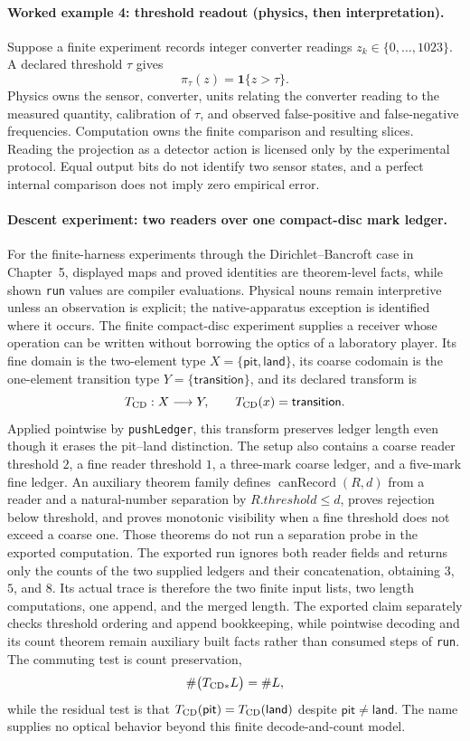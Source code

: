 \paragraph{Worked example 4: threshold readout (physics, then interpretation).}
Suppose a finite experiment records integer converter readings \(z_k\in\{0,\ldots,1023\}\).  A declared threshold
\(\tau\) gives
\[
              \pi_\tau(z)=\mathbf 1\{z>\tau\}.
\]
Physics owns the sensor, converter, units relating the converter reading to the measured quantity, calibration of \(\tau\), and observed
false-positive and false-negative frequencies.  Computation owns the finite comparison and resulting slices.  Reading
the projection as a detector action is licensed only by the experimental protocol.  Equal output bits do not identify
two sensor states, and a perfect internal comparison does not imply zero empirical error.

\paragraph{Descent experiment: two readers over one compact-disc mark ledger.}
For the finite-harness experiments through the Dirichlet--Bancroft case in Chapter~5, displayed maps and proved
identities are theorem-level facts, while shown \texttt{run} values are compiler evaluations.  Physical nouns remain
interpretive unless an observation is explicit; the native-apparatus exception is identified where it occurs.
The finite compact-disc experiment supplies a receiver whose operation can be written without borrowing the optics of a laboratory player.
Its fine domain is the two-element type \(X=\{\mathsf{pit},\mathsf{land}\}\), its coarse codomain is the one-element transition type \(Y=\{\mathsf{transition}\}\), and its declared transform is
\[
 T_{\rm CD}:X\longrightarrow Y,
 \qquad T_{\rm CD}(x)=\mathsf{transition}.
\]
Applied pointwise by \texttt{pushLedger}, this transform preserves ledger length even though it erases the pit--land distinction.
The setup also contains a coarse reader threshold \(2\), a fine reader threshold \(1\), a three-mark coarse ledger, and a five-mark fine ledger.
An auxiliary theorem family defines \(\operatorname{canRecord}(R,d)\) from a reader and a natural-number separation by \(R.\mathit{threshold}\le d\), proves rejection below threshold, and proves monotonic visibility when a fine threshold does not exceed a coarse one.
Those theorems do not run a separation probe in the exported computation.
The exported run ignores both reader fields and returns only the counts of the two supplied ledgers and their concatenation, obtaining \(3\), \(5\), and \(8\).
Its actual trace is therefore the two finite input lists, two length computations, one append, and the merged length.
The exported claim separately checks threshold ordering and append bookkeeping, while pointwise decoding and its count theorem remain auxiliary built facts rather than consumed steps of \texttt{run}.
The commuting test is count preservation,
\[
 \#\bigl(T_{\rm CD*}L\bigr)=\#L,
\]
while the residual test is that \(T_{\rm CD}(\mathsf{pit})=T_{\rm CD}(\mathsf{land})\) despite \(\mathsf{pit}\ne\mathsf{land}\).
The name supplies no optical behavior beyond this finite decode-and-count model.

